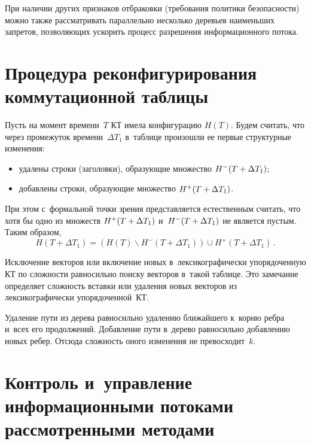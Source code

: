 \begin{multicols}{2}
  При наличии других признаков отбраковки (требования политики 
безопасности) можно также рассматривать параллельно несколько деревьев 
наименьших запретов, позволяющих ускорить процесс разрешения 
информационного потока.

\vspace*{-8pt} 
  
\section{Процедура реконфигурирования коммутационной таблицы}

\vspace*{-2pt}
  
  Пусть на момент времени~$T$ КТ имела конфигурацию $H(T)$. Будем 
считать, что через промежуток времени~$\Delta T_1$ в~таблице произошли ее 
первые структурные изменения:
  \begin{itemize}
\item удалены строки (заголовки), образующие множество $H^-(T\hm+\Delta 
T_1)$;\\[-14pt]
\item добавлены строки, образующие множество $H^+(T\hm+ \Delta T_1)$.
\end{itemize}
При этом с~формальной точки зрения представляется естественным считать, 
что хотя бы одно из множеств $H^+(T\hm+\Delta T_1)$ и~$H^-(T\hm+\Delta 
T_1)$ не является пустым. 
Таким образом,
$$
H(T+\Delta T_1) = (H(T)\backslash H^-(T+\Delta T_1) )\cup H^+ (T+\Delta T_1)\,.
$$
  
  Исключение векторов или включение новых в~лексикографически 
упорядоченную КТ по сложности равносильно поиску векторов в~такой 
таблице. Это замечание определяет сложность вставки или удаления новых 
векторов из лексикографически упорядоченной~КТ. 
  
  Удаление пути из дерева равносильно удалению ближайшего к~корню ребра 
и~всех его продолжений. Добавление пути в~дерево равносильно добавлению 
новых ребер. Отсюда сложность оного изменения не превосходит~$k$.

\vspace*{-9pt}
  
\section{Контроль и~управление информационными потоками 
рассмотренными методами}

\vspace*{-2pt}
  

\end{multicols}

